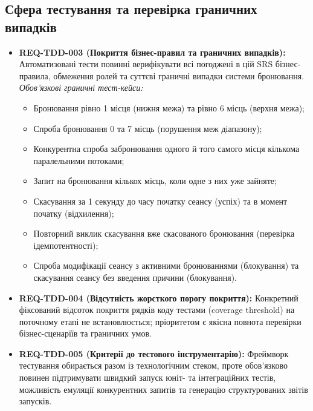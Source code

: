 \subsection{Сфера тестування та перевірка граничних випадків}\label{sec:tdd-scope}

\begin{itemize}[leftmargin=*,labelindent=0pt]
    \item \textbf{REQ-TDD-003 (Покриття бізнес-правил та граничних випадків):} Автоматизовані тести повинні верифікувати всі погоджені в цій SRS бізнес-правила, обмеження ролей та суттєві граничні випадки системи бронювання.~
    \textit{Обов'язкові граничні тест-кейси:}
    \begin{itemize}
        \item Бронювання рівно 1 місця (нижня межа) та рівно 6 місць (верхня межа);
        \item Спроба бронювання 0 та 7 місць (порушення меж діапазону);
        \item Конкурентна спроба забронювання одного й того самого місця кількома паралельними потоками;
        \item Запит на бронювання кількох місць, коли одне з них уже зайняте;
        \item Скасування за 1 секунду до часу початку сеансу (успіх) та в момент початку (відхилення);
        \item Повторний виклик скасування вже скасованого бронювання (перевірка ідемпотентності);
        \item Спроба модифікації сеансу з активними бронюваннями (блокування) та скасування сеансу без введення причини (блокування).
    \end{itemize}
    
    \item \textbf{REQ-TDD-004 (Відсутність жорсткого порогу покриття):} Конкретний фіксований відсоток покриття рядків коду тестами (coverage threshold) на поточному етапі не встановлюється; пріоритетом є якісна повнота перевірки бізнес-сценаріїв та граничних умов.~
    
    \item \textbf{REQ-TDD-005 (Критерії до тестового інструментарію):} Фреймворк тестування обирається разом із технологічним стеком, проте обов'язково повинен підтримувати швидкий запуск юніт- та інтеграційних тестів, можливість емуляції конкурентних запитів та генерацію структурованих звітів запусків.~
\end{itemize}

